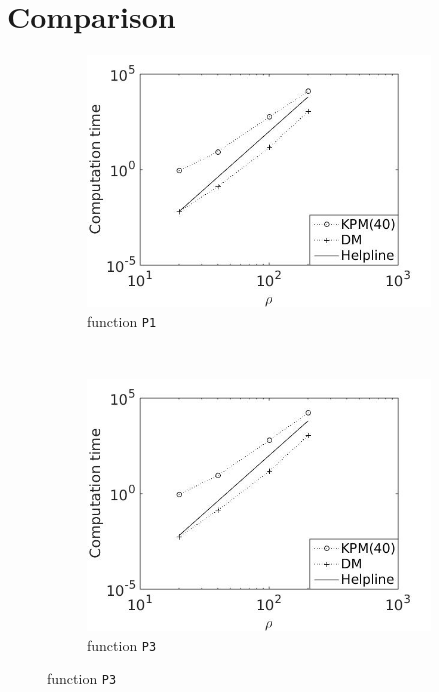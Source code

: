\section{Comparison}
\begin{figure}[H]
        \centering
        \begin{subfigure}[b]{0.45\textwidth}
                \includegraphics[width=\textwidth]{fig/c1comp1m}
                \caption{function \texttt{P1}}
                \label{fig:c1comp1m}
        \end{subfigure}%
        ~
        \begin{subfigure}[b]{0.45\textwidth}
                \includegraphics[width=\textwidth]{fig/c2comp2m}
                \caption{function \texttt{P3}}
                \label{fig:c2comp2m}
        \end{subfigure}
        

\end{figure}
